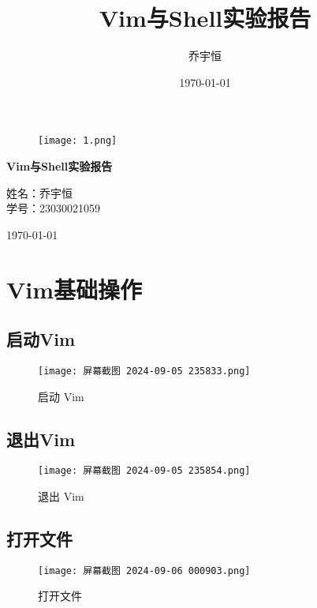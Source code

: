 \documentclass[a4paper, 12pt]{article}
\title{Vim与Shell实验报告}
\author{乔宇恒}
\date{\today}
\begin{document}
\begin{titlepage}
    \centering
    \begin{figure}
        \centering
        \texttt{[image: 1.png]}
    \end{figure}
    \vspace*{1in} %
    
    \Huge
    \textbf{Vim与Shell实验报告} %
    
    \vspace{1in} %
    
    \Large
    \songti 
    姓名：乔宇恒
    \\学号：23030021059
    
    \vspace{1in} %
    
    \Large
    \today 
    
    \vfill %

    \thispagestyle{empty} %
\end{titlepage}

\tableofcontents
\newpage

\section{Vim基础操作}

\subsection{启动Vim}
\begin{figure}[H]
    \centering
    \texttt{[image: 屏幕截图 2024-09-05 235833.png]}
    \caption{启动 Vim}
    \label{fig:start_vim}
\end{figure}

\subsection{退出Vim}
\begin{figure}[H]
    \centering
    \texttt{[image: 屏幕截图 2024-09-05 235854.png]}
    \caption{退出 Vim}
    \label{fig:exit_vim}
\end{figure}

\subsection{打开文件}
\begin{figure}[H]
    \centering
    \texttt{[image: 屏幕截图 2024-09-06 000903.png]}
    \caption{打开文件}
    \label{fig:open_file}
\end{figure}
\end{document}
